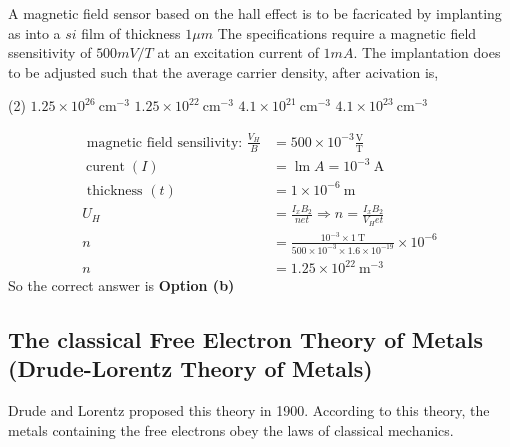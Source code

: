 \begin{exercise}
	A magnetic field sensor based on the hall effect is to be facricated by implanting as into a $si$ film of thickness $1\mu m$
	The specifications require a magnetic field ssensitivity of $500 mV/T$ at an excitation current of $1 mA$. The implantation does to be adjusted such that the average carrier density, after acivation is,
	 \begin{tasks}(2)
		\task[\textbf{a.}] $1.25 \times 10^{26} \mathrm{~cm}^{-3}$
		\task[\textbf{b.}]$1.25 \times 10^{22} \mathrm{~cm}^{-3}$
		\task[\textbf{c.}]$4.1 \times 10^{21} \mathrm{~cm}^{-3}$
		\task[\textbf{d.}] $4.1 \times 10^{23} \mathrm{~cm}^{-3}$
	\end{tasks}
\end{exercise}
\begin{answer}
	\begin{align*}\text { magnetic field sensilivity: } \frac{V_{H}}{B}&=500 \times 10^{-3} \frac{\mathrm{V}}{\mathrm{T}}\\
	\operatorname{curent}(I)&=\operatorname{lm} A=10^{-3} \mathrm{~A}\\
	\text { thickness }(t)&=1 \times 10^{-6} \mathrm{~m}\\
	U_{H}&=\frac{I_{x} B_{2}}{n e t} \Rightarrow n=\frac{I_{x} B_{2}}{V_{H} e t}\\
	n&=\frac{10^{-3} \times 1 \mathrm{~T}}{500 \times 10^{-3} \times 1.6 \times 10^{-19}} \times 10^{-6} \\
	n&=1.25 \times 10^{22} \mathrm{~m}^{-3}
	\end{align*}
		So the correct answer is \textbf{Option (b)}
\end{answer}
\subsection{ The classical Free Electron Theory of Metals (Drude-Lorentz Theory of Metals)} 
Drude and Lorentz proposed this theory in 1900. According to this theory, the metals containing the free electrons obey the laws of classical mechanics.
